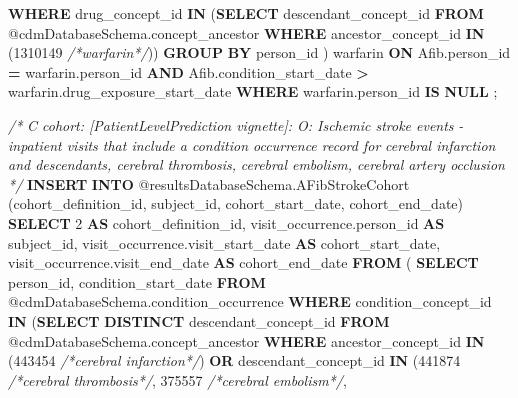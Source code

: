 \documentclass[
]{article}
\newenvironment{Shaded}{\begin{snugshade}}{\end{snugshade}}
\newcommand{\CommentTok}[1]{\textcolor[rgb]{0.56,0.35,0.01}{\textit{#1}}}
\newcommand{\DecValTok}[1]{\textcolor[rgb]{0.00,0.00,0.81}{#1}}
\newcommand{\KeywordTok}[1]{\textcolor[rgb]{0.13,0.29,0.53}{\textbf{#1}}}
\newcommand{\NormalTok}[1]{#1}
\newcommand{\OperatorTok}[1]{\textcolor[rgb]{0.81,0.36,0.00}{\textbf{#1}}}
\begin{document}
\begin{Shaded}
\begin{Highlighting}[]
  \KeywordTok{WHERE}\NormalTok{ drug\_concept\_id }\KeywordTok{IN}\NormalTok{ (}\KeywordTok{SELECT}\NormalTok{ descendant\_concept\_id }\KeywordTok{FROM} 
\NormalTok{  @cdmDatabaseSchema.concept\_ancestor }\KeywordTok{WHERE}\NormalTok{ ancestor\_concept\_id }\KeywordTok{IN} 
\NormalTok{  (}\DecValTok{1310149} \CommentTok{/*warfarin*/}\NormalTok{))}
  \KeywordTok{GROUP} \KeywordTok{BY}\NormalTok{ person\_id}
\NormalTok{  ) warfarin}
  \KeywordTok{ON}\NormalTok{ Afib.person\_id }\OperatorTok{=}\NormalTok{ warfarin.person\_id}
  \KeywordTok{AND}\NormalTok{ Afib.condition\_start\_date }\OperatorTok{\textgreater{}}\NormalTok{ warfarin.drug\_exposure\_start\_date}
  \KeywordTok{WHERE}\NormalTok{ warfarin.person\_id }\KeywordTok{IS} \KeywordTok{NULL}
\NormalTok{  ;}
  
  \CommentTok{/*}
\CommentTok{  C cohort:  [PatientLevelPrediction vignette]:  O: Ischemic stroke events}
\CommentTok{  {-} inpatient visits that include a condition occurrence record for }
\CommentTok{  \textquotesingle{}cerebral infarction\textquotesingle{} and descendants, \textquotesingle{}cerebral thrombosis\textquotesingle{}, }
\CommentTok{  \textquotesingle{}cerebral embolism\textquotesingle{}, \textquotesingle{}cerebral artery occlusion\textquotesingle{} }
\CommentTok{  */}
  \KeywordTok{INSERT} \KeywordTok{INTO}\NormalTok{ @resultsDatabaseSchema.AFibStrokeCohort (cohort\_definition\_id, }
\NormalTok{  subject\_id, }
\NormalTok{  cohort\_start\_date, }
\NormalTok{  cohort\_end\_date)}
  \KeywordTok{SELECT} \DecValTok{2} \KeywordTok{AS}\NormalTok{ cohort\_definition\_id,}
\NormalTok{  visit\_occurrence.person\_id }\KeywordTok{AS}\NormalTok{ subject\_id,}
\NormalTok{  visit\_occurrence.visit\_start\_date }\KeywordTok{AS}\NormalTok{ cohort\_start\_date,}
\NormalTok{  visit\_occurrence.visit\_end\_date }\KeywordTok{AS}\NormalTok{ cohort\_end\_date}
  \KeywordTok{FROM}  
\NormalTok{  (}
  \KeywordTok{SELECT}\NormalTok{ person\_id, condition\_start\_date}
  \KeywordTok{FROM}\NormalTok{ @cdmDatabaseSchema.condition\_occurrence}
  \KeywordTok{WHERE}\NormalTok{ condition\_concept\_id }\KeywordTok{IN}\NormalTok{ (}\KeywordTok{SELECT} \KeywordTok{DISTINCT}\NormalTok{ descendant\_concept\_id }\KeywordTok{FROM} 
\NormalTok{  @cdmDatabaseSchema.concept\_ancestor }\KeywordTok{WHERE}\NormalTok{ ancestor\_concept\_id }\KeywordTok{IN} 
\NormalTok{  (}\DecValTok{443454} \CommentTok{/*cerebral infarction*/}\NormalTok{) }\KeywordTok{OR}\NormalTok{ descendant\_concept\_id }\KeywordTok{IN} 
\NormalTok{  (}\DecValTok{441874} \CommentTok{/*cerebral thrombosis*/}\NormalTok{, }\DecValTok{375557} \CommentTok{/*cerebral embolism*/}\NormalTok{, }

\end{Highlighting}
\end{Shaded}
\end{document}
